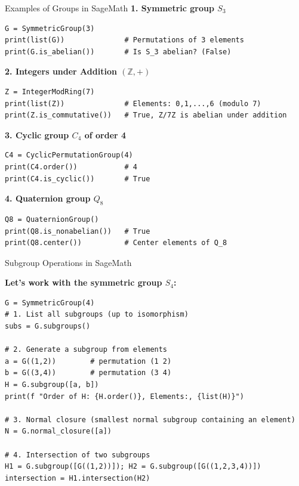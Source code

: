 \documentclass[10pt]{beamer}
\begin{document}
\begin{frame}[fragile]{Examples of Groups in SageMath}
\vspace{-1mm}
\textbf{1. Symmetric group $S_3$}
\begin{lstlisting}[style=mypython]
G = SymmetricGroup(3)
print(list(G))              # Permutations of 3 elements
print(G.is_abelian())       # Is S_3 abelian? (False)
\end{lstlisting}

\vspace{-1mm}

\textbf{2. Integers under Addition $(\mathbb{Z},+)$}
\begin{lstlisting}[style=mypython]
Z = IntegerModRing(7)
print(list(Z))              # Elements: 0,1,...,6 (modulo 7)
print(Z.is_commutative())   # True, Z/7Z is abelian under addition
\end{lstlisting}

\vspace{-1mm}

\textbf{3. Cyclic group $C_4$ of order 4}
\begin{lstlisting}[style=mypython]
C4 = CyclicPermutationGroup(4)
print(C4.order())           # 4
print(C4.is_cyclic())       # True
\end{lstlisting}

\vspace{-1mm}

\textbf{4. Quaternion group $Q_8$}
\begin{lstlisting}[style=mypython]
Q8 = QuaternionGroup()
print(Q8.is_nonabelian())   # True
print(Q8.center())          # Center elements of Q_8
\end{lstlisting}
\end{frame}

\begin{frame}[fragile]{Subgroup Operations in SageMath}

\textbf{Let's work with the symmetric group $S_4$:}

\begin{lstlisting}[style=mypython]
G = SymmetricGroup(4)
# 1. List all subgroups (up to isomorphism)
subs = G.subgroups()

# 2. Generate a subgroup from elements
a = G((1,2))        # permutation (1 2)
b = G((3,4))        # permutation (3 4)
H = G.subgroup([a, b])
print(f "Order of H: {H.order()}, Elements:, {list(H)}")

# 3. Normal closure (smallest normal subgroup containing an element)
N = G.normal_closure([a])

# 4. Intersection of two subgroups
H1 = G.subgroup([G((1,2))]); H2 = G.subgroup([G((1,2,3,4))])
intersection = H1.intersection(H2)
\end{lstlisting}

\end{frame}
\end{document}
